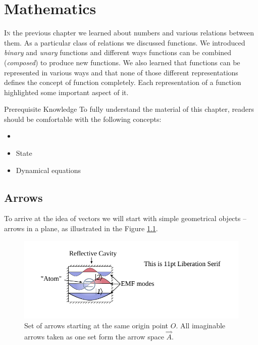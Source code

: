 \graphicspath{{../03Mathematics/pics/}}

\chapter{Mathematics}\label{ch:Mathematics}

\lettrine[lines=2]{\color{darkocre}I}{n} the previous chapter we
learned about numbers and various relations between them. As a
particular class of relations we discussed functions. We introduced
\emph{binary} and \emph{unary} functions and different ways
functions can be combined (\emph{composed}) to produce new
functions. We also learned
that functions can be
represented in various ways and that none of those different
representations defines
the concept of function completely. Each representation of a function
highlighted some important aspect of it.

\begin{myprereq}{Prerequisite Knowledge}
	To fully understand the material of this chapter, readers should be comfortable with the following concepts:
	
	\begin{itemize}
		\item \phantom{phantom}
		\vspace{-0.5cm}
		\item State
		\item Dynamical equations
	\end{itemize}	
\end{myprereq}


\section{Arrows}

To arrive at the idea of vectors we will start with simple geometrical
objects -- arrows in a plane, as illustrated in the Figure \ref{fig:arrowsSpace}.

\begin{figure}%
  \includegraphics[scale=1.0]{defaultFigureTemplate}
  \caption{Set of arrows starting at the same origin point $O$. All
    imaginable arrows taken as one set form the arrow space
    $\overset{\Rightarrow}{A}$.}
  \label{fig:arrowsSpace}
\end{figure}

